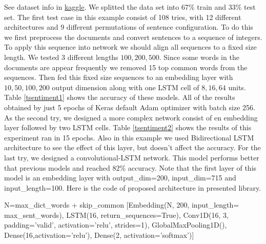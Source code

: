 \documentclass[10pt]{SelfArx} %
\begin{document}
See dataset info in \href{https://www.kaggle.com/ashukr/rnnsentiment-data}{kaggle}. We splitted the data set into 67\% train and 33\% test set. The first test case in this example consist of 108 tries, with 12 different architectures and 9 different permutations of sentence configuration. To do this we first preprocess the documents and convert sentences to a sequence of integers. To apply this sequence into network we should align all sequences to a fixed size length. We tested 3 different lengths $100,200,500$. Since some words in the documents are appear frequently we removed 15 top common words from the sequences. Then fed this fixed size sequences to an embedding layer with $10,50,100,200$ output dimension along with one LSTM cell of $8,16,64$ units. Table \ref{tsentiment1} shows the accuracy of these models. All of the results obtained by just 5 epochs of Keras default Adam optimizer with batch size 256.  As the second try, we designed a more complex network consist of en embedding layer followed by two LSTM cells. Table \ref{tsentiment2} shows the results of this experiment ran in 15 epochs. Also in this example we used Bidirectional LSTM architecture to see the effect of this layer, but doesn't affect the accuracy.  For the last try, we designed a convolutional-LSTM network. This model performs better that previous models and reached $82\%$ accuracy. Note that the first layer of this model is an embedding layer with output\_dim=200, input\_dim=715 and input\_length=100. Here is the code of proposed architecture in presented library.
\begin{python}
N=max_dict_words + skip_common
[Embedding(N, 200, input_length=
max_sent_words), 
LSTM(16, return_sequences=True),
Conv1D(16, 3, padding='valid',
activation='relu', strides=1),
GlobalMaxPooling1D(),
Dense(16,activation='relu'),
Dense(2, activation='softmax')]
\end{python}
\end{document}
